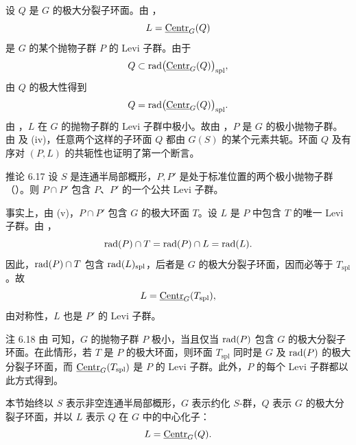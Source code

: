 设 \(Q\) 是 \(G\) 的极大分裂子环面。由 ，
\[
 L=\underline{\operatorname{Centr}}_G(Q)
\]
是 \(G\) 的某个抛物子群 \(P\) 的 Levi 子群。由于
\[
 Q\subset\operatorname{rad}\bigl(\underline{\operatorname{Centr}}_G(Q)\bigr)_{\mathrm{spl}},
\]
由 \(Q\) 的极大性得到
\[
 Q=\operatorname{rad}\bigl(\underline{\operatorname{Centr}}_G(Q)\bigr)_{\mathrm{spl}}.
\]
由 ，\(L\) 在 \(G\) 的抛物子群的 Levi 子群中极小。故由 ，\(P\) 是 \(G\) 的极小抛物子群。由  及 \textup{(iv)}，任意两个这样的子环面 \(Q\) 都由 \(G(S)\) 的某个元素共轭。环面 \(Q\) 及有序对 \((P,L)\) 的共轭性也证明了第一个断言。

\begin{sgastatement}{推论 6.17}
设 \(S\) 是连通半局部概形，\(P,P'\) 是处于标准位置的两个极小抛物子群 \textup{（）}。则 \(P\cap P'\) 包含 \(P\)、\(P'\) 的一个公共 Levi 子群。
\end{sgastatement}

事实上，由 \textup{(v)}，\(P\cap P'\) 包含 \(G\) 的极大环面 \(T\)。设 \(L\) 是 \(P\) 中包含 \(T\) 的唯一 Levi 子群。由 ，
\[
 \operatorname{rad}(P)\cap T=\operatorname{rad}(P)\cap L=\operatorname{rad}(L).
\]
因此，\(\operatorname{rad}(P)\cap T\) 包含 \(\operatorname{rad}(L)_{\mathrm{spl}}\)，后者是 \(G\) 的极大分裂子环面，因而必等于 \(T_{\mathrm{spl}}\)。故
\[
 L=\underline{\operatorname{Centr}}_G(T_{\mathrm{spl}}),
\]
由对称性，\(L\) 也是 \(P'\) 的 Levi 子群。

\begin{sgastatement}{注 6.18}
由  可知，\(G\) 的抛物子群 \(P\) 极小，当且仅当 \(\operatorname{rad}(P)\) 包含 \(G\) 的极大分裂子环面。在此情形，若 \(T\) 是 \(P\) 的极大环面，则环面 \(T_{\mathrm{spl}}\) 同时是 \(G\) 及 \(\operatorname{rad}(P)\) 的极大分裂子环面，而 \(\underline{\operatorname{Centr}}_G(T_{\mathrm{spl}})\) 是 \(P\) 的 Levi 子群。此外，\(P\) 的每个 Levi 子群都以此方式得到。
\end{sgastatement}



本节始终以 \(S\) 表示非空连通半局部概形，\(G\) 表示约化 \(S\)-群，\(Q\) 表示 \(G\) 的极大分裂子环面，并以 \(L\) 表示 \(Q\) 在 \(G\) 中的中心化子：
\[
 L=\underline{\operatorname{Centr}}_G(Q).
\]

